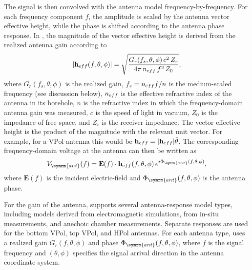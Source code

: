         The signal is then convolved with the antenna model frequency-by-frequency.
        For each frequency component $f$, the amplitude is scaled by the antenna vector effective height, while the phase is shifted according to the antenna phase response.
        In \arasim{}, the magnitude of the vector effective height is derived from the realized antenna gain according to
        \begin{equation}
        |\mathbf{h}_{\textrm eff}(f,\theta,\phi)|
        =
        \sqrt{
        \frac{G_r(f_{s},\theta,\phi)\, c^2\, Z_r}
        {4\pi\, n_{\textrm eff}\, f^2\, Z_0}
        }, \label{eq:heff}
        \end{equation}
        where $G_r(f_s,\theta,\phi)$ is the realized gain, $f_s = n_{\textrm eff} f / n$ is the medium-scaled frequency (see discussion below), $n_{\textrm eff}$ is the effective refractive index of the antenna in its borehole, $n$ is the refractive index in which the frequency-domain antenna gain was measured, $c$ is the speed of light in vacuum, $Z_0$ is the impedance of free space, and $Z_r$ is the receiver impedance.
        The vector effective height is the product of the magnitude with the
        relevant unit vector.
        For example, for a VPol antenna this would be $\mathbf{h}_{\textrm eff} = |\mathbf{h}_{\textrm eff}| \hat{\theta}$.
        The corresponding frequency-domain voltage at the antenna can then be written as
        \begin{equation}
        V_{\symrm{ant}}(f) = \mathbf{E}(f) \cdot \mathbf{h}_{\textrm eff}(f,\theta,\phi)\, e^{i\Phi_{\symrm{ant}}(f,\theta,\phi)},
        \end{equation}
        where $\mathbf{E}(f)$ is the incident electric-field and $\Phi_{\symrm{ant}}(f,\theta,\phi)$ is the antenna phase.

        For the gain of the antenna, \arasim{} supports several antenna-response model types, including models derived from electromagnetic simulations, from in-situ measurements, and anechoic chamber measurements.
        Separate responses are used for the bottom VPol, top VPol, and HPol antennas.
        For each antenna type, \arasim{} uses a realized gain
        $G_r(f,\theta,\phi)$
        and phase
        $\Phi_{\symrm{ant}}(f,\theta,\phi)$,
        where $f$ is the signal frequency and $(\theta,\phi)$ specifies the signal arrival direction in the antenna coordinate system.
        
